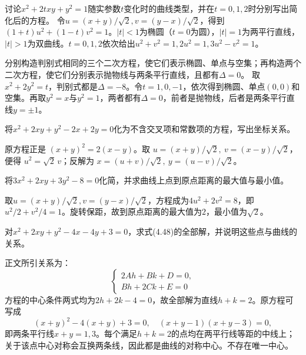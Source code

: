 讨论\(x^2+2txy+y^2=1\)随实参数\(t\)变化时的曲线类型，并在\(t=0,1,2\)时分别写出简化后的方程。
\solutionanswer
令\(u=(x+y)/\sqrt2,v=(y-x)/\sqrt2\)，得到\((1+t)u^2+(1-t)v^2=1\)。\(|t|<1\)为椭圆（\(t=0\)为圆），\(|t|=1\)为两平行直线，\(|t|>1\)为双曲线。\(t=0,1,2\)依次给出\(u^2+v^2=1,2u^2=1,3u^2-v^2=1\)。


分别构造判别式相同的三个二次方程，使它们表示椭圆、单点与空集；再构造两个二次方程，使它们分别表示抛物线与两条平行直线，且都有\(\Delta=0\)。
\solutionanswer
取\(x^2+2y^2=t\)，判别式都是\(\Delta=-8\)。令\(t=1,0,-1\)，依次得到椭圆、单点\((0,0)\)和空集。再取\(y^2=x\)与\(y^2=1\)，两者都有\(\Delta=0\)，前者是抛物线，后者是两条平行直线\(y=\pm1\)。


将\(x^2+2xy+y^2-2x+2y=0\)化为不含交叉项和常数项的方程，写出坐标关系。
\par
\solutionanswer
原方程正是 \((x+y)^2=2(x-y)\)。取 \(u=(x+y)/\sqrt2,\ v=(x-y)/\sqrt2\)，便得 \(u^2=\sqrt2\,v\)；反解为 \(x=(u+v)/\sqrt2,\ y=(u-v)/\sqrt2\)。


将\(3x^2+2xy+3y^2-8=0\)化简，并求曲线上点到原点距离的最大值与最小值。
\par
\solutionanswer
取\(u=(x+y)/\sqrt2,v=(y-x)/\sqrt2\)，方程成为\(4u^2+2v^2=8\)，即\(u^2/2+v^2/4=1\)。旋转保距，故到原点距离的最大值为\(2\)，最小值为\(\sqrt2\)。


对\(x^2+2xy+y^2-4x-4y+3=0\)，求式\textup{(4.48)}的全部解，并说明这些点与曲线的关系。
\par

\par\smallskip\noindent 正文所引关系为：
\begin{equation*}
\begin{cases}
        2Ah+Bk+D=0 ,\\
        Bh+2Ck+E=0
    \end{cases}
\end{equation*}
\solutionanswer
方程的中心条件两式均为\(2h+2k-4=0\)，故全部解为直线\(h+k=2\)。原方程可写成
\[(x+y)^2-4(x+y)+3=0,\quad (x+y-1)(x+y-3)=0,\]
即两条平行线\(x+y=1,3\)。每个满足\(h+k=2\)的点均在两平行线等距的中线上；关于该点中心对称会互换两条线，因此都是曲线的对称中心。不存在唯一中心。



